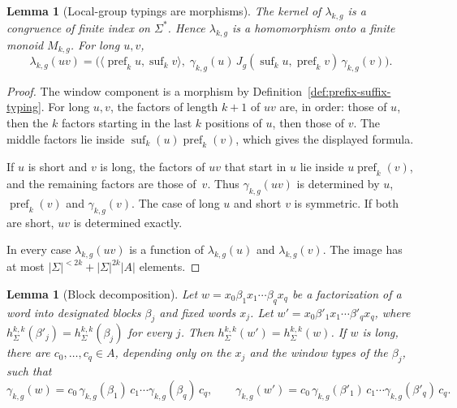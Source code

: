 \documentclass[11pt]{article}
\numberwithin{equation}{section}
\theoremstyle{plain}
\newtheorem{lemma}[theorem]{Lemma}
\theoremstyle{definition}
\theoremstyle{remark}
\theoremstyle{plain}
\begin{document}
\begin{lemma}[Local-group typings are morphisms]
\label{lem:local-group-morphism-v82}
The kernel of $\lambda_{k,g}$ is a congruence of finite index on
$\Sigma^*$.  Hence $\lambda_{k,g}$ is a homomorphism onto a finite
monoid $M_{k,g}$.  For long $u,v$,
\[
 \lambda_{k,g}(uv)
 =\bigl(\langle\operatorname{pref}_k u,\operatorname{suf}_k v\rangle,\;
   \gamma_{k,g}(u)\,J_g(\operatorname{suf}_k u,\operatorname{pref}_k v)\,
   \gamma_{k,g}(v)\bigr).
\]
\end{lemma}

\begin{proof}
The window component is a morphism by
Definition~\ref{def:prefix-suffix-typing}.
For long $u,v$, the factors of length $k+1$ of $uv$ are, in order:
those of $u$, then the $k$ factors starting in the last $k$ positions
of $u$, then those of $v$.  The middle factors lie inside
$\operatorname{suf}_k(u)\operatorname{pref}_k(v)$, which gives the
displayed formula.

If $u$ is short and $v$ is long, the factors of $uv$ that start in $u$
lie inside $u\operatorname{pref}_k(v)$, and the remaining factors are
those of~$v$.  Thus $\gamma_{k,g}(uv)$ is determined by $u$,
$\operatorname{pref}_k(v)$ and $\gamma_{k,g}(v)$.  The case of long $u$
and short $v$ is symmetric.  If both are short, $uv$ is determined
exactly.

In every case $\lambda_{k,g}(uv)$ is a function of
$\lambda_{k,g}(u)$ and $\lambda_{k,g}(v)$.  The image has at most
$|\Sigma|^{<2k}+|\Sigma|^{2k}|A|$ elements.
\end{proof}

\begin{lemma}[Block decomposition]
\label{lem:local-group-blocks-v82}
Let $w=x_0\beta_1x_1\cdots\beta_qx_q$ be a factorization of a word into
designated blocks $\beta_j$ and fixed words $x_j$.  Let
$w'=x_0\beta'_1x_1\cdots\beta'_qx_q$, where
$h^{k,k}_\Sigma(\beta'_j)=h^{k,k}_\Sigma(\beta_j)$ for every $j$.
Then $h^{k,k}_\Sigma(w')=h^{k,k}_\Sigma(w)$.  If $w$ is long, there are
$c_0,\ldots,c_q\in A$, depending only on the $x_j$ and the window types
of the $\beta_j$, such that
\[
 \gamma_{k,g}(w)=c_0\,\gamma_{k,g}(\beta_1)\,c_1\cdots
   \gamma_{k,g}(\beta_q)\,c_q,
 \qquad
 \gamma_{k,g}(w')=c_0\,\gamma_{k,g}(\beta'_1)\,c_1\cdots
   \gamma_{k,g}(\beta'_q)\,c_q.
\]
\end{lemma}
\end{document}
